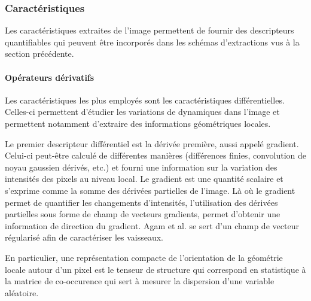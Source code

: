 

\subsubsection{Caractéristiques}

Les caractéristiques extraites de l'image permettent de fournir des descripteurs quantifiables qui peuvent être incorporés dans les schémas d'extractions vus à la section précédente.

\paragraph{Opérateurs dérivatifs}

Les caractéristiques les plus employés sont les caractéristiques différentielles. Celles-ci permettent d'étudier les variations de dynamiques dans l'image et permettent notamment d'extraire des informations géométriques locales.

Le premier descripteur différentiel est la dérivée première, aussi appelé gradient. Celui-ci peut-être calculé de différentes manières (différences finies, convolution de noyau gaussien dérivés, etc.) et fourni une information sur la variation des intensités des pixels au niveau local. Le gradient est une quantité scalaire et s'exprime comme la somme des dérivées partielles de l'image. Là où le gradient permet de quantifier les changements d'intensités, l'utilisation des dérivées partielles sous forme de champ de vecteurs gradients, permet d'obtenir une information de direction du gradient. Agam et al. \cite{Agam2005_vessel_1st_order} se sert d'un champ de vecteur régularisé afin de caractériser les vaisseaux.
 
En particulier, une représentation compacte de l'orientation de la géométrie locale autour d'un pixel est le tenseur de structure qui correspond en statistique à la matrice de co-occurence qui sert à mesurer la dispersion d'une variable aléatoire.

